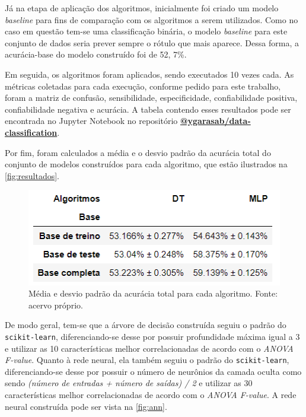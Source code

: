 \documentclass[12pt]{article}
\begin{document}
Já na etapa de aplicação dos algoritmos, inicialmente foi criado um modelo \textit{baseline} para fins de comparação com os algoritmos a serem utilizados. Como no caso em questão tem-se uma classificação binária, o modelo \textit{baseline} para este conjunto de dados seria prever sempre o rótulo que mais aparece. Dessa forma, a acurácia-base do modelo construído foi de 52, 7\%.

Em seguida, os algoritmos foram aplicados, sendo executados 10 vezes cada. As métricas coletadas para cada execução, conforme pedido para este trabalho, foram a matriz de confusão, sensibilidade, especificidade, confiabilidade positiva, confiabilidade negativa e acurácia. A tabela contendo esses resultados pode ser encontrada no Jupyter Notebook no repositório \textbf{\href{https://github.com/ygarasab/data-classification}{@ygarasab/data-classification}}.

Por fim, foram calculados a média e o desvio padrão da acurácia total do conjunto de modelos construídos para cada algoritmo, que estão ilustrados na \autoref{fig:resultados}.

\begin{figure}[t!]
    \includegraphics[width=\linewidth]{figures/resultados}
    \caption{Média e desvio padrão da acurácia total para cada algoritmo. Fonte: acervo próprio.}
    \label{fig:resultados}
\end{figure}

De modo geral, tem-se que a árvore de decisão construída seguiu o padrão do \texttt{scikit-learn}, diferenciando-se desse por possuir profundidade máxima igual a 3 e utilizar as 10 características melhor correlacionadas de acordo com o \textit{ANOVA F-value}. Quanto à rede neural, ela também seguiu o padrão do \texttt{scikit-learn}, diferenciando-se desse por possuir o número de neurônios da camada oculta como sendo \textit{(número de entradas + número de saídas) / 2} e utilizar as 30 características melhor correlacionadas de acordo com o \textit{ANOVA F-value}. A rede neural construída pode ser vista na \autoref{fig:ann}.
\end{document}
